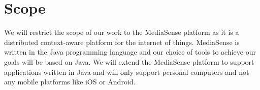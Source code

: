\section{Scope}
We will restrict the scope of our work to the MediaSense platform as it is a distributed context-aware platform for the internet of things. MediaSense is written in the Java programming language and our choice of tools to achieve our goals will be based on Java. We will extend the MediaSense platform to support applications written in Java and will only support personal computers and not any mobile platforms like iOS or Android.
